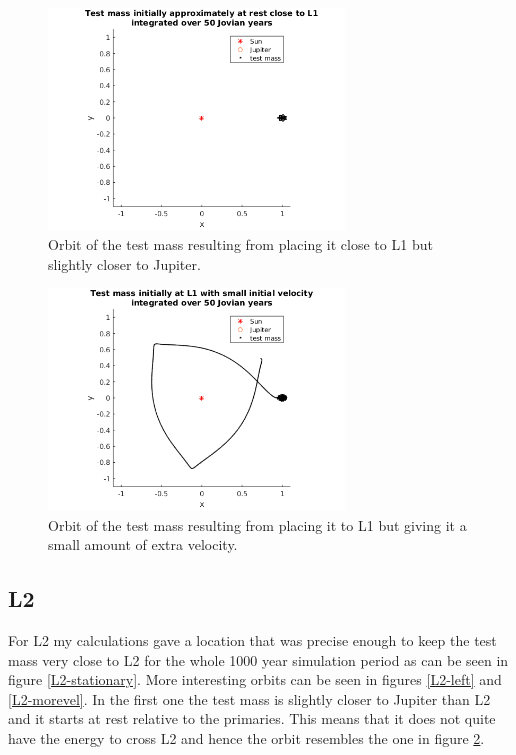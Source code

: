 \documentclass[12pt,a4paper,titlepage]{article}
\begin{document}
\begin{figure}
\centering
\includegraphics[width=0.7\textwidth]{../plots/L1-right.png}
\caption{Orbit of the test mass resulting from placing it close to L1 but slightly closer to Jupiter.}
\label{L1-right}
\end{figure}

\begin{figure}
\centering
\includegraphics[width=0.7\textwidth]{../plots/L1-morevel.png}
\caption{Orbit of the test mass resulting from placing it to L1 but giving it a small amount of extra velocity.}
\label{L1-morevel}
\end{figure}

\subsection{L2}
For L2 my calculations gave a location that was precise enough to keep the test mass very close to L2 for the whole 1000 year simulation period as can be seen in figure \ref{L2-stationary}. More interesting orbits can be seen in figures \ref{L2-left} and \ref{L2-morevel}. In the first one the test mass is slightly closer to Jupiter than L2 and it starts at rest relative to the primaries. This means that it does not quite have the energy to cross L2 and hence the orbit resembles the one in figure \ref{L1-morevel}.
\end{document}
